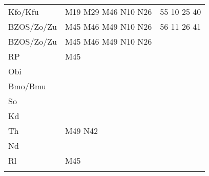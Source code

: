 \begin{tabular}{!{\color{schiefergrau}\vrule width 3pt}*{3}{l!{\color{schiefergrau}\vrule width 3pt}}}
Kfo/Kfu      & \nueins{} \nudrei{} \nuneun{} \mbus{} M19 M29 M46 \nbus{} N10 N26 & 55 10 25 40 \\
BZOS/Zo/Zu   & \nueins{} \nuneun{} \mbus{} M45 M46 M49 \nbus{} N10 N26           & 56 11 26 41 \\
\hline
BZOS/Zo/Zu   & \nueins{} \nuneun{} \mbus{} M45 M46 M49 \nbus{} N10 N26           & \\
RP           & \mbus{} M45                                                       & \\
Obi          &                                                                   & \\
Bmo/Bmu      & \nusieben{}                                                       & \\
So           &                                                                   & \\
Kd           &                                                                   & \\
Th           & \mbus{} M49 \nbus{} N42                                           & \\
Nd           &                                                                   & \\
Rl           & \mbus{} M45                                                       & \\
\myhline
\end{tabular}
%
